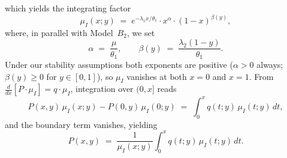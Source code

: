 which yields the integrating factor
\begin{equation}
    \mu_I(x;y) \;=\; e^{-\lambda_1 x/\theta_1}\cdot x^{\alpha}\cdot (1-x)^{\beta(y)},
    \label{eq:C2:integrating_factor}
\end{equation}
where, in parallel with Model~$B_2$, we set
\begin{equation}
    \alpha \;=\; \frac{\mu}{\theta_1}, \qquad \beta(y) \;=\; \frac{\lambda_2(1-y)}{\theta_1}.
    \label{eq:C2:exponents}
\end{equation}
Under our stability assumptions both exponents are positive ($\alpha>0$ always; $\beta(y)\ge0$ for $y\in[0,1]$), so $\mu_I$ vanishes at both $x=0$ and $x=1$. From $\tfrac{d}{dx}[P\cdot\mu_I] = q\cdot\mu_I$, integration over $(0,x]$ reads
\begin{equation}
    P(x,y)\,\mu_I(x;y) - P(0,y)\,\mu_I(0;y) \;=\; \int_0^x q(t;y)\,\mu_I(t;y)\,dt,
\end{equation}
and the boundary term vanishes, yielding
\begin{equation}
    P(x,y) \;=\; \frac{1}{\mu_I(x;y)} \int_0^x q(t;y)\,\mu_I(t;y)\,dt.
    \label{eq:C2:Pxy_implicit}
\end{equation}

